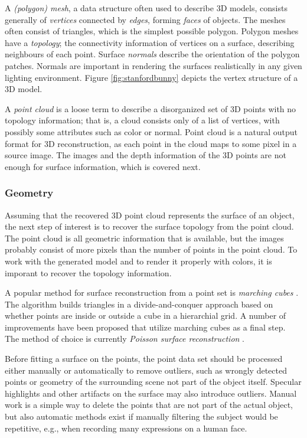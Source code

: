 
A \emph{(polygon) mesh}, a data structure often used to describe 3D models, consists generally of \emph{vertices} connected by \emph{edges}, forming \emph{faces} of objects.
The meshes often consist of triangles, which is the simplest possible polygon.
Polygon meshes have a \emph{topology}; the connectivity information of vertices on a surface, describing neighbours of each point.
Surface \emph{normals} describe the orientation of the polygon patches.
Normals are important in rendering the surfaces realistically in any given lighting environment.
Figure \ref{fig:stanfordbunny} depicts the vertex structure of a 3D model.

A \emph{point cloud} is a loose term to describe a disorganized set of 3D points with no topology information; that is, a cloud consists only of a list of vertices, with possibly some attributes such as color or normal.
Point cloud is a natural output format for 3D reconstruction, as each point in the cloud maps to some pixel in a source image.
The images and the depth information of the 3D points are not enough for surface information, which is covered next.


\subsubsection{Geometry} %

Assuming that the recovered 3D point cloud represents the surface of an object, the next step of interest is to recover the surface topology from the point cloud.
The point cloud is all geometric information that is available, but the images probably consist of more pixels than the number of points in the point cloud.
To work with the generated model and to render it properly with colors, it is imporant to recover the topology information.

A popular method for surface reconstruction from a point set is \emph{marching cubes} \cite{lorensen1987marching}.
The algorithm builds triangles in a divide-and-conquer approach based on whether points are inside or outside a cube in a hierarchial grid.
A number of improvements have been proposed that utilize marching cubes as a final step.
The method of choice is currently \emph{Poisson surface reconstruction} \cite{kazhdan2006poisson,kazhdan2013screened}.

Before fitting a surface on the points, the point data set should be processed either manually or automatically to remove outliers, such as wrongly detected points or geometry of the surrounding scene not part of the object itself.
Specular highlights and other artifacts on the surface may also introduce outliers.
Manual work is a simple way to delete the points that are not part of the actual object, but also automatic methods exist \cite{?} if manually filtering the subject would be repetitive, e.g., when recording many expressions on a human face.

